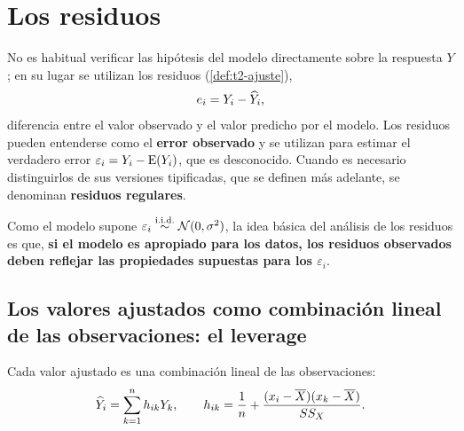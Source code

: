 \section{Los residuos}
\label{sec:t4-residuos}

No es habitual verificar las hipótesis del modelo directamente sobre la respuesta $Y$; en su
lugar se utilizan los residuos (\cref{def:t2-ajuste}),
\[
  e_i = Y_i-\widehat{Y}_i ,
\]
diferencia entre el valor observado y el valor predicho por el modelo. Los residuos pueden
entenderse como el \textbf{error observado} y se utilizan para estimar el verdadero error
$\varepsilon_i=Y_i-\operatorname{E}(Y_i)$, que es desconocido. Cuando es necesario distinguirlos de sus
versiones tipificadas, que se definen más adelante, se denominan \textbf{residuos regulares}.

Como el modelo supone $\varepsilon_i\overset{\text{i.i.d.}}{\sim}\mathcal{N}(0,\sigma^2)$, la idea básica del análisis de los
residuos es que, \textbf{si el modelo es apropiado para los datos, los residuos observados
deben reflejar las propiedades supuestas para los $\varepsilon_i$}.

\subsection{Los valores ajustados como combinación lineal de las observaciones: el leverage}

\begin{proposicion}
  Cada valor ajustado es una combinación lineal de las observaciones:
  \[
    \widehat{Y}_i = \sum_{k=1}^{n} h_{ik}Y_k,
    \qquad
    h_{ik} = \frac1n + \frac{(x_i-\overline{X})(x_k-\overline{X})}{SS_X}.
  \]
\end{proposicion}

